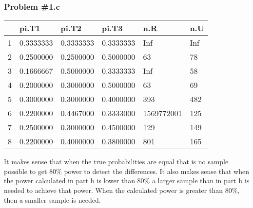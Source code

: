 \documentclass[12pt, letterpaper]{article}
\begin{document}
\subsubsection*{Problem {\#}1.c} 
\begin{table}[ht]
	\centering
	\begin{tabular}{rlllll}
		\hline
		& pi.T1 & pi.T2 & pi.T3 & n.R & n.U \\ 
		\hline
		1 & 0.3333333 & 0.3333333 & 0.3333333 & Inf & Inf \\ 
		2 & 0.2500000 & 0.2500000 & 0.5000000 & 63 & 78 \\ 
		3 & 0.1666667 & 0.5000000 & 0.3333333 & Inf & 58 \\ 
		4 & 0.2000000 & 0.3000000 & 0.5000000 & 63 & 69 \\ 
		5 & 0.3000000 & 0.3000000 & 0.4000000 & 393 & 482 \\ 
		6 & 0.2200000 & 0.4467000 & 0.3333000 & 1569772001 & 125 \\ 
		7 & 0.2500000 & 0.3000000 & 0.4500000 & 129 & 149 \\ 
		8 & 0.2200000 & 0.4000000 & 0.3800000 & 801 & 165 \\ 
		\hline
	\end{tabular}
\end{table}

It makes sense that when the true probabilities are equal that is no sample possible to get 80\% power to detect the differences.  It also makes sense that when the power calculated in part b is lower than 80\% a larger sample than in part b is needed to achieve that power.  When the calculated power is greater than 80\%, then a smaller sample is needed.   
\end{document}
